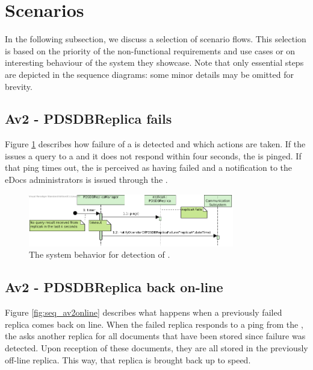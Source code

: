 \section{Scenarios}\label{sec:scenarios}
In the following subsection, we discuss a selection of scenario flows. This selection is based on the priority of the non-functional requirements and use cases or on interesting behaviour of the system they showcase. Note that only essential steps are depicted in the sequence diagrams: some minor details may be omitted for brevity.

\subsection{Av2 - PDSDBReplica fails}
Figure \ref{fig:seq_av2fail} describes how failure of a  is detected and which actions are taken. If the  issues a query to a  and it does not respond within four seconds, the  is pinged. If that ping times out, the  is perceived as having failed and a notification to the eDocs administrators is issued through the .

\begin{figure}[!htp]
    \centering
    \includegraphics[width=0.8\textwidth]{figures/Av2 - PDSDBReplica fails.png}
    \caption{The system behavior for detection of .
        }\label{fig:seq_av2fail}
\end{figure}

\subsection{Av2 - PDSDBReplica back on-line}
Figure \ref{fig:seq_av2online} describes what happens when a previously failed replica comes back on line. When the failed replica responds to a ping from the , the  asks another replica for all documents that have been stored since failure was detected. Upon reception of these documents, they are all stored in the previously off-line replica. This way, that replica is brought back up to speed.

